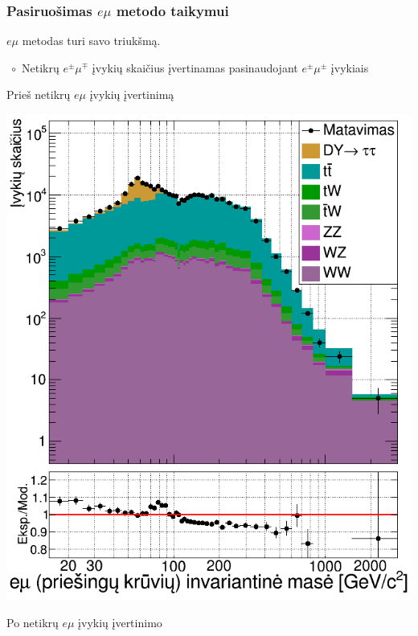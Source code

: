 \documentclass[xcolor=dvipsnames]{beamer}
\newcommand{\emu}{\mathit{e}\mu}
\begin{document}
\begin{frame}
	\frametitle{Pasiruošimas $\emu$ metodo taikymui}
	\vspace{-0.01cm}
	$\emu$ metodas turi savo triukšmą.
	
	\small	
	$\phantom{.}\circ$ Netikrų $\mathit{e}^{\pm}\mu^{\mp}$ įvykių skaičius įvertinamas pasinaudojant $\mathit{e}^{\pm}\mu^{\pm}$ įvykiais\\
	\vspace{0.3cm}
	\begin{minipage}{0.46\textwidth}
		\centering \small
		Prieš netikrų $\emu$ įvykių įvertinimą
		
		\includegraphics[width=0.9\linewidth]{emuMassOS_SMALL.png}
	\end{minipage}
	\hfill
	\begin{minipage}{0.46\textwidth}
		\centering \small
		Po netikrų $\emu$ įvykių įvertinimo
		

\end{minipage}
\end{frame}
\end{document}
